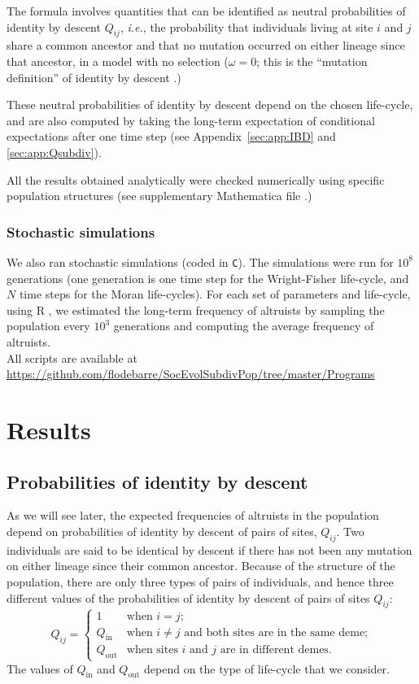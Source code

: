 \documentclass[11pt, letterpaper]{article}
\newcommand{\ie}{\textit{i.e.}}
\newcommand{\appname}[0]{Appendix}
\newcommand{\inn}{\textrm{in}}
\newcommand{\out}{\textrm{out}}
\newcommand{\Qin}{Q_{\inn}}
\newcommand{\Qout}{Q_{\out}}
\begin{document}
The formula involves quantities that can be identified as neutral probabilities of identity by descent $Q_{ij}$, \ie, the probability that individuals living at site $i$  and $j$ share a common ancestor and that no mutation occurred on either lineage since that ancestor, in a model with no selection ($\omega=0$; this is the ``mutation definition'' of identity by descent \citep{RoussetBilliard2000}.)

These neutral probabilities of identity by descent depend on the chosen life-cycle, and are also computed by taking the long-term expectation of conditional expectations after one time step (see \appname~\ref{sec:app:IBD} and \ref{sec:app:Qsubdiv}). 

All the results obtained analytically were checked numerically using specific population structures (see supplementary Mathematica file \citep{Mathematica11}.)

\subsubsection{Stochastic simulations}
We also ran stochastic simulations (coded in \texttt{C}). The simulations were run for $10^8$ generations (one generation is one time step for the Wright-Fisher life-cycle, and $N$ time steps for the Moran life-cycles). For each set of parameters and life-cycle, using R \citep{R2015}, we estimated the long-term frequency of altruists by sampling the population every $10^3$ generations and computing the average frequency of altruists.\\
%
All scripts are available at \\
{\small \url{https://github.com/flodebarre/SocEvolSubdivPop/tree/master/Programs}} 

\section{Results}

\subsection{Probabilities of identity by descent}

As we will see later, the expected frequencies of altruists in the population depend on probabilities of identity by descent of pairs of sites, $Q_{ij}$. Two individuals are said to be identical by descent if there has not been any mutation on either lineage since their common ancestor.  Because of the structure of the population, there are only three types of pairs of individuals, and hence three different values of the probabilities of identity by descent of pairs of sites $Q_{ij}$:
\begin{equation}
Q_{ij} = 
\begin{cases}
1 & \textrm{when $i=j$;}\\
%
\Qin & \textrm{when $i\neq j$ and both sites are in the same deme;}\\
%
\Qout & \textrm{when sites $i$ and $j$ are in different demes.}
\end{cases}
\end{equation}
The values of $\Qin$ and $\Qout$ depend on the type of life-cycle that we consider. 
\end{document}
